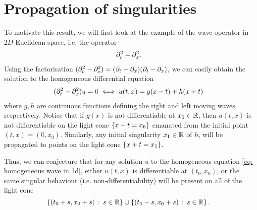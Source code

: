 \documentclass[12pt]{article}
\begin{document}




\section{Propagation of singularities} 

To motivate this result, we will first look at the example of the wave operator in $2D$ Euclidean space, i.e. the operator
\begin{align*}
\partial_t^2 - \partial_x^2. 
\end{align*}
Using the factorisation $(\partial_t^2 - \partial_x^2) = (\partial_t + \partial_x) (\partial_t - \partial_x)$, we can easily obtain the solution to the homogeneous differential equation 
\begin{align}
(\partial_t^2 - \partial_x^2) u = 0 \iff u(t, x) = g(x -t) + h(x + t) \label{eq: homogeneous wave in 1d} 
\end{align}
where $g, h$ are continuous functions defining the right and left moving waves respectively. Notice that if $g(x)$ is not differentiable at $x_0 \in {\ensuremath {\mathbb R}}$, then $u(t, x)$ is not differentiable on the light cone $\left\{x - t = x_0\right\}$ emanated from the initial point $(t, x) = (0, x_0)$. Similarly, any initial singularity $x_1 \in {\ensuremath {\mathbb R}}$ of $h$, will be propagated to points on the light cone $\left\{x + t = x_1\right\}$. 

\begin{center}
\end{center}

Thus, we can conjecture that for any solution $u$ to the homogeneous equation \ref{eq: homogeneous wave in 1d}, either $u(t, x)$ is differentiable at $(t_0, x_0)$, or the same singular behaviour (i.e. non-differentiability) will be present on all of the light cone 
$$\left\{(t_0 + s, x_0 +s) \, : \, s \in {\ensuremath {\mathbb R}}\right\} \cup \left\{(t_0 - s, x_0 + s) \, : \, s \in {\ensuremath {\mathbb R}}\right\}.$$
\end{document}
